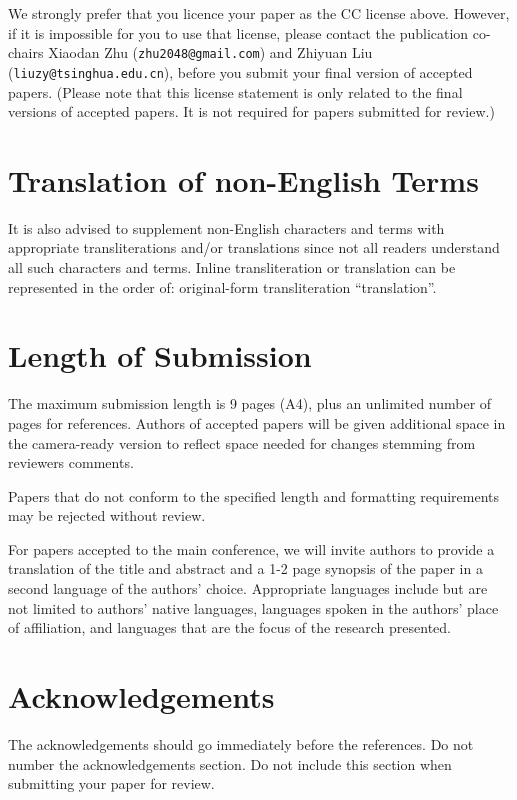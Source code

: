 We strongly prefer that you licence your paper as the CC license
above. However, if it is impossible for you to use that license, please 
contact the publication co-chairs Xiaodan Zhu
(\texttt{zhu2048@gmail.com}) and Zhiyuan Liu (\texttt{liuzy@tsinghua.edu.cn}),
before you submit your final version of accepted papers. 
(Please note that this license statement is only related to the final versions of accepted papers. 
It is not required for papers submitted for review.)

\section{Translation of non-English Terms}

It is also advised to supplement non-English characters and terms
with appropriate transliterations and/or translations
since not all readers understand all such characters and terms.
Inline transliteration or translation can be represented in
the order of: original-form transliteration ``translation''.

\section{Length of Submission}
\label{sec:length}

The maximum submission length is 9 pages (A4), plus an unlimited number of pages for
references. Authors of accepted papers will be given additional space in
the camera-ready version to reflect space needed for changes stemming
from reviewers comments.

Papers that do not
conform to the specified length and formatting requirements may be
rejected without review.

For papers accepted to the main conference, we will invite authors to provide a translation 
of the title and abstract and a 1-2 page synopsis of the paper in a second 
language of the authors' choice. Appropriate languages include but are not 
limited to authors' native languages, languages spoken in the authors' place 
of affiliation, and languages that are the focus of the research presented.

\section*{Acknowledgements}

The acknowledgements should go immediately before the references.  Do
not number the acknowledgements section. Do not include this section
when submitting your paper for review.